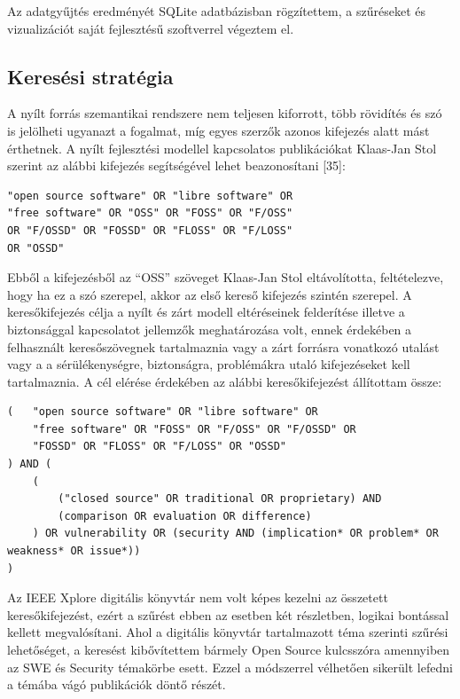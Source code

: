 \documentclass[12pt,magyar,a4paper,oneside]{scrreprt}
\begin{document}
Az adatgyűjtés eredményét SQLite adatbázisban rögzítettem, a szűréseket
és vizualizációt saját fejlesztésű szoftverrel végeztem el.

\hypertarget{keresuxe9si-stratuxe9gia}{%
\subsection{Keresési stratégia}\label{keresuxe9si-stratuxe9gia}}

A nyílt forrás szemantikai rendszere nem teljesen kiforrott, több
rövidítés és szó is jelölheti ugyanazt a fogalmat, míg egyes szerzők
azonos kifejezés alatt mást érthetnek. A nyílt fejlesztési modellel
kapcsolatos publikációkat Klaas-Jan Stol szerint az alábbi kifejezés
segítségével lehet beazonosítani {[}35{]}:

\begin{verbatim}
"open source software" OR "libre software" OR
"free software" OR "OSS" OR "FOSS" OR "F/OSS"
OR "F/OSSD" OR "FOSSD" OR "FLOSS" OR "F/LOSS"
OR "OSSD"
\end{verbatim}

Ebből a kifejezésből az ``OSS'' szöveget Klaas-Jan Stol eltávolította,
feltételezve, hogy ha ez a szó szerepel, akkor az első kereső kifejezés
szintén szerepel. A keresőkifejezés célja a nyílt és zárt modell
eltéréseinek felderítése illetve a biztonsággal kapcsolatot jellemzők
meghatározása volt, ennek érdekében a felhasznált keresőszövegnek
tartalmaznia vagy a zárt forrásra vonatkozó utalást vagy a a
sérülékenységre, biztonságra, problémákra utaló kifejezéseket kell
tartalmaznia. A cél elérése érdekében az alábbi keresőkifejezést
állítottam össze:

\begin{verbatim}
(   "open source software" OR "libre software" OR 
    "free software" OR "FOSS" OR "F/OSS" OR "F/OSSD" OR 
    "FOSSD" OR "FLOSS" OR "F/LOSS" OR "OSSD"
) AND (
    ( 
        ("closed source" OR traditional OR proprietary) AND 
        (comparison OR evaluation OR difference)
    ) OR vulnerability OR (security AND (implication* OR problem* OR weakness* OR issue*))
)
\end{verbatim}

Az IEEE Xplore digitális könyvtár nem volt képes kezelni az összetett
keresőkifejezést, ezért a szűrést ebben az esetben két részletben,
logikai bontással kellett megvalósítani. Ahol a digitális könyvtár
tartalmazott téma szerinti szűrési lehetőséget, a keresést kibővítettem
bármely Open Source kulcsszóra amennyiben az SWE és Security témakörbe
esett. Ezzel a módszerrel vélhetően sikerült lefedni a témába vágó
publikációk döntő részét.
\end{document}
